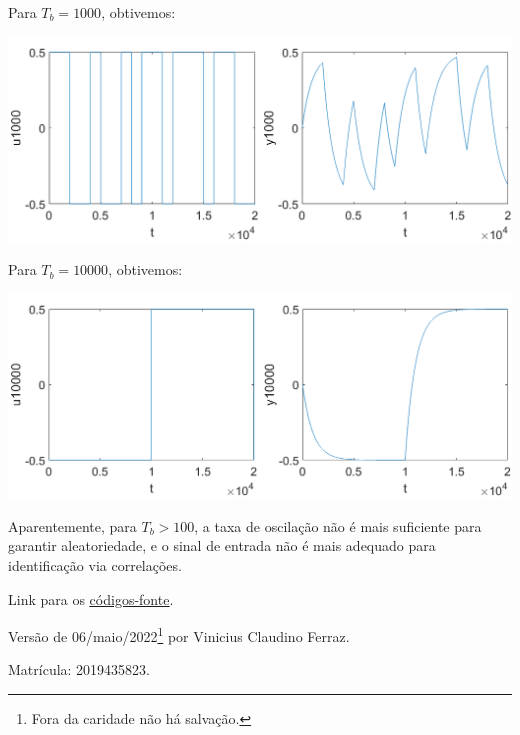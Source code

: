 \documentclass{rbfin}
\begin{document}
Para $T_b = 1000$, obtivemos:

\begin{center}
\includegraphics[scale=0.65]{5u1k}
\end{center}

\newpage

Para $T_b = 10000$, obtivemos:

\begin{center}
\includegraphics[scale=0.65]{5u10k}
\end{center}

Aparentemente, para $T_b > 100$, a taxa de oscilação não é mais suficiente para garantir aleatoriedade, e o sinal de entrada não é mais adequado para identificação via correlações.

\vspace{6mm}

Link para os \href{https://drive.google.com/file/d/15xBpWf6KBn7H9UEi94khlrKB8rwDWyDS/view?usp=sharing}{\color{blue}\underline{códigos-fonte}}.

Versão de 06/maio/2022\footnote{Fora da caridade não há salvação.} por Vinicius Claudino Ferraz. 

Matrícula: 2019435823.
\end{document}
